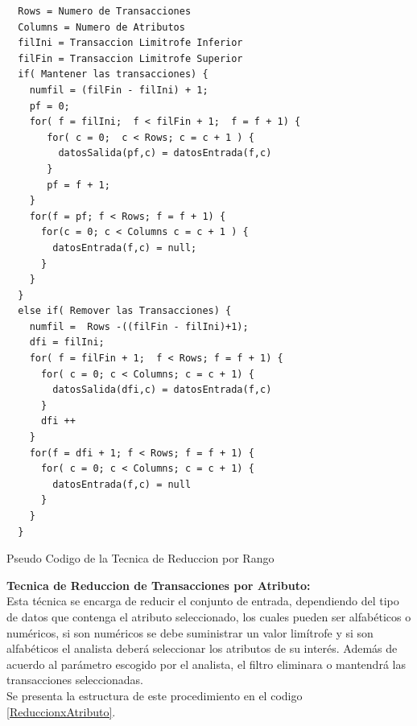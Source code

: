 \begin{codigof}[!h]
\fontsize{8}{2}
\begin{verbatim} 
  Rows = Numero de Transacciones
  Columns = Numero de Atributos
  filIni = Transaccion Limitrofe Inferior
  filFin = Transaccion Limitrofe Superior
  if( Mantener las transacciones) { 
    numfil = (filFin - filIni) + 1;
    pf = 0;
    for( f = filIni;  f < filFin + 1;  f = f + 1) {
       for( c = 0;  c < Rows; c = c + 1 ) {
         datosSalida(pf,c) = datosEntrada(f,c)
       }
       pf = f + 1;
    }
    for(f = pf; f < Rows; f = f + 1) {
      for(c = 0; c < Columns c = c + 1 ) {
        datosEntrada(f,c) = null;
      }
    }
  }
  else if( Remover las Transacciones) { 
    numfil =  Rows -((filFin - filIni)+1);
    dfi = filIni;
    for( f = filFin + 1;  f < Rows; f = f + 1) {
      for( c = 0; c < Columns; c = c + 1) {
        datosSalida(dfi,c) = datosEntrada(f,c)        
      }
      dfi ++
    } 
    for(f = dfi + 1; f < Rows; f = f + 1) {
      for( c = 0; c < Columns; c = c + 1) {
        datosEntrada(f,c) = null        
      }
    } 
  } 
\end{verbatim}
\caption{Pseudo Codigo de la Tecnica de Reduccion por Rango}
\label{ReduccionxRango}
\end{codigof}
      
\textbf{Tecnica de  Reduccion de Transacciones por Atributo:} \\ 
Esta t\'ecnica se encarga de reducir el conjunto de entrada, dependiendo del tipo de datos que contenga el atributo seleccionado, los cuales pueden ser alfab\'eticos o num\'ericos, si son num\'ericos se debe suministrar un valor lim\'itrofe y si son alfab\'eticos el analista deber\'a seleccionar los atributos de su inter\'es. Adem\'as de acuerdo al par\'ametro escogido por el analista, el filtro eliminara o mantendr\'a las transacciones seleccionadas. \\
Se presenta la estructura de este procedimiento en el codigo \ref{ReduccionxAtributo}. \\

